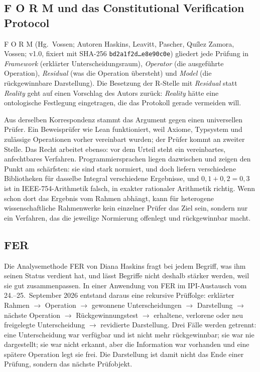 \subsection{F O R M und das Constitutional Verification Protocol}

F O R M (Hg.\ Vossen; Autoren Haskins, Leavitt, Pascher, Quílez Zamora, Vossen; v1.0,
fixiert mit SHA-256 \texttt{bd2a1f2d\ldots e8e90c0e}) gliedert jede Prüfung in
\emph{Framework} (erklärter Unterscheidungsraum), \emph{Operator} (die ausgeführte
Operation), \emph{Residual} (was die Operation übersteht) und \emph{Model} (die
rückgewinnbare Darstellung). Die Besetzung der R-Stelle mit \emph{Residual} statt
\emph{Reality} geht auf einen Vorschlag des Autors zurück: \emph{Reality} hätte eine
ontologische Festlegung eingetragen, die das Protokoll gerade vermeiden will.

Aus derselben Korrespondenz stammt das Argument gegen einen universellen Prüfer. Ein
Beweisprüfer wie Lean funktioniert, weil Axiome, Typsystem und zulässige Operationen
vorher vereinbart wurden; der Prüfer kommt an zweiter Stelle. Das Recht arbeitet ebenso:
vor dem Urteil steht ein vereinbartes, anfechtbares Verfahren. Programmiersprachen liegen
dazwischen und zeigen den Punkt am schärfsten: sie sind stark normiert, und doch liefern
verschiedene Bibliotheken für dasselbe Integral verschiedene Ergebnisse, und
$0{,}1+0{,}2=0{,}3$ ist in IEEE-754-Arithmetik falsch, in exakter rationaler Arithmetik
richtig. Wenn schon dort das Ergebnis vom Rahmen abhängt, kann für heterogene
wissenschaftliche Rahmenwerke kein einzelner Prüfer das Ziel sein, sondern nur ein
Verfahren, das die jeweilige Normierung offenlegt und rückgewinnbar macht.

\subsection{FER}

Die Analysemethode FER von Diana Haskins fragt bei jedem Begriff, was ihm seinen Status
verdient hat, und lässt Begriffe nicht deshalb stärker werden, weil sie gut
zusammenpassen. In einer Anwendung von FER im IPI-Austausch vom 24.--25.~September 2026
entstand daraus eine rekursive Prüffolge: erklärter Rahmen $\to$ Operation $\to$ gewonnene Unterscheidungen $\to$
Darstellung $\to$ nächste Operation $\to$ Rückgewinnungstest $\to$ erhaltene, verlorene
oder neu freigelegte Unterscheidung $\to$ revidierte Darstellung. Drei Fälle werden
getrennt: eine Unterscheidung war verfügbar und ist nicht mehr rückgewinnbar; sie war
nie dargestellt; sie war nicht erkannt, aber die Information war vorhanden und eine
spätere Operation legt sie frei. Die Darstellung ist damit nicht das Ende einer Prüfung,
sondern das nächste Prüfobjekt.

